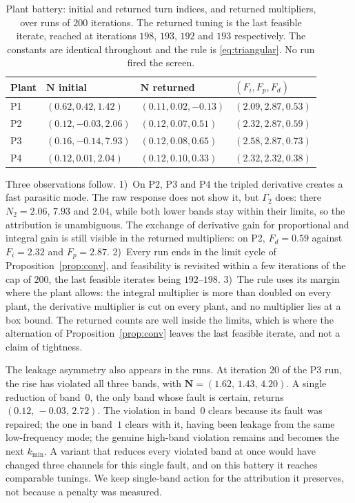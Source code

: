 \documentclass[final,3p,times,twocolumn]{elsarticle}
\begin{document}
\begin{table}[t]
\centering\footnotesize
\caption{Plant battery: initial and returned turn indices, and returned
multipliers, over runs of $200$ iterations. The returned tuning is the
last feasible iterate, reached at iterations $198$, $193$, $192$ and
$193$ respectively. The constants are identical throughout and the rule
is \eqref{eq:triangular}. No run fired the screen.}
\label{tab:battery}
\setlength{\tabcolsep}{3.5pt}
\begin{tabular}{@{}llll@{}}
\toprule
Plant & $\mathbf N$ initial & $\mathbf N$ returned & $(F_i, F_p, F_d)$ \\
\midrule
P1 &
$(0.62, 0.42, 1.42)$ & $(0.11, 0.02, -0.13)$ & $(2.09, 2.87, 0.53)$ \\
P2 &
$(0.12, -0.03, 2.06)$ & $(0.12, 0.07, 0.51)$ & $(2.32, 2.87, 0.59)$ \\
P3 &
$(0.16, -0.14, 7.93)$ & $(0.12, 0.08, 0.65)$ & $(2.58, 2.87, 0.73)$ \\
P4 &
$(0.12, 0.01, 2.04)$ & $(0.12, 0.10, 0.33)$ & $(2.32, 2.32, 0.38)$ \\
\bottomrule
\end{tabular}
\end{table}

Three observations follow. 1)~On P2, P3 and P4 the tripled derivative
creates a fast parasitic mode. The raw response does not show it, but
$\Gamma_2$ does: there $N_2 = 2.06$, $7.93$ and $2.04$, while both
lower bands stay within their limits, so the attribution is
unambiguous. The exchange of derivative gain for proportional and
integral gain is still visible in the returned multipliers: on P2,
$F_d = 0.59$ against $F_i = 2.32$ and $F_p = 2.87$.
2)~Every run ends in the limit cycle of Proposition~\ref{prop:conv},
and feasibility is revisited within a few iterations of the cap of
$200$, the last feasible iterates being $192$--$198$.
3)~The rule uses its margin where the plant allows: the integral
multiplier is more than doubled on every plant, the derivative
multiplier is cut on every plant, and no multiplier lies at a box
bound. The returned counts are well inside the limits, which is where
the alternation of Proposition~\ref{prop:conv} leaves the last feasible
iterate, and not a claim of tightness.

The leakage asymmetry also appears in the runs. At iteration $20$ of
the P3 run, the rise has violated all three bands, with
$\mathbf N = (1.62,\, 1.43,\, 4.20)$. A single reduction of band~$0$,
the only band whose fault is certain, returns
$(0.12,\, -0.03,\, 2.72)$. The violation in band~$0$ clears because its
fault was repaired; the one in band~$1$ clears with it, having been
leakage from the same low-frequency mode; the genuine high-band
violation remains and becomes the next $k_{\min}$. A variant that
reduces every violated band at once would have changed three channels
for this single fault, and on this battery it reaches comparable
tunings. We keep single-band action for the attribution it preserves,
not because a penalty was measured.
\end{document}
